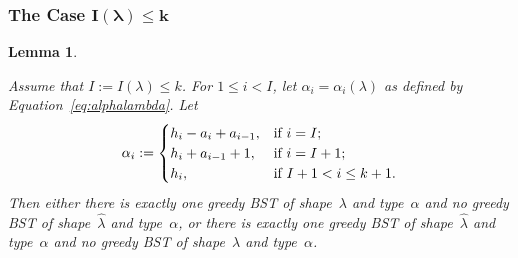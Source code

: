 \documentclass[12pt]{article}
\newtheorem{lemma}{Lemma}
\theoremstyle{definition}
\begin{document}
\subsubsection{The Case
\texorpdfstring{$\bm{I(\lambda)\le k}$}{Ik}} 
\label{subsec:Ilek}

\begin{lemma}
\label{lem:case0}

Assume that $I := I(\lambda) \le k$.
For $1 \le i < I$, let $\alpha_i = \alpha_i(\lambda)$
as defined by Equation~\eqref{eq:alphalambda}. Let
\begin{equation*}
\alpha_i :=
\begin{cases}
h_i - a_i +a_{i-1}, &\mbox{\rm {if} $i = I$;} \\
h_i + a_{i-1} + 1, &\mbox{\rm {if} $i = I+1$;} \\
h_i, &\mbox{{\rm if} $ I+1 < i \le k+1$.}
\end{cases}
\end{equation*}
Then either there is exactly one greedy BST
of shape~$\lambda$ and type~$\alpha$ and no greedy BST
of shape~$\hat \lambda$ and type~$\alpha$, or
there is exactly one greedy BST
of shape~$\hat \lambda$ and type~$\alpha$ and no greedy BST
of shape~$\lambda$ and type~$\alpha$.
\end{lemma}
\end{document}
